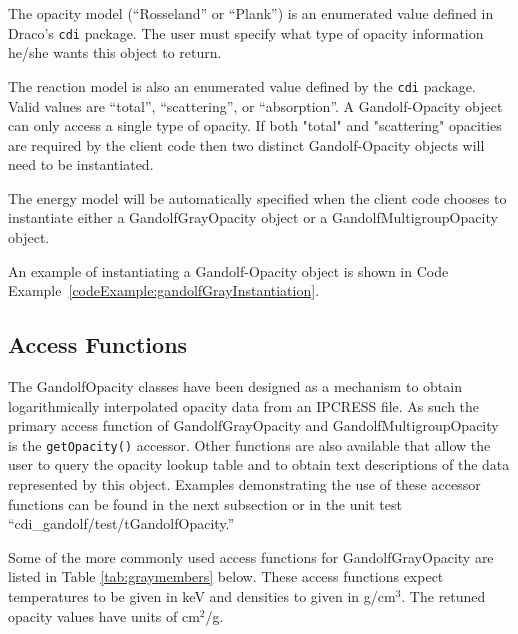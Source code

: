 \documentclass[11pt]{nmemo}
\newcommand{\draco}{{\normalfont\sffamily Draco}}
\begin{document}
The opacity model (``Rosseland'' or ``Plank'') is an enumerated value
defined in \draco's \texttt{cdi} package.  The user must specify what
type of opacity information he/she wants this object to return.

The reaction model is also an enumerated value defined by the
\texttt{cdi} package.  Valid values are ``total'', ``scattering'', or
``absorption''.  A Gandolf-Opacity object can only access a single
type of opacity.  If both "total" and "scattering" opacities are
required by the client code then two distinct Gandolf-Opacity objects
will need to be instantiated.

The energy model will be automatically specified when the client code
chooses to instantiate either a GandolfGrayOpacity object or a
GandolfMultigroupOpacity object.

An example of instantiating a Gandolf-Opacity object is shown in Code
Example~\ref{codeExample:gandolfGrayInstantiation}.


\subsection{Access Functions}

The GandolfOpacity classes have been designed as a mechanism to obtain
logarithmically interpolated opacity data from an IPCRESS file.  As
such the primary access function of GandolfGrayOpacity and
GandolfMultigroupOpacity is the \texttt{getOpacity()} accessor.  Other
functions are also available that allow the user to query the opacity
lookup table and to obtain text descriptions of the data represented
by this object. Examples demonstrating the use of these accessor
functions can be found in the next subsection or in the unit test
``cdi\_gandolf/test/tGandolfOpacity.''

Some of the more commonly used access functions for GandolfGrayOpacity
are listed in Table \ref{tab:graymembers} below.  These access
functions expect temperatures to be given in keV and densities to
given in g/cm$^3$.  The retuned opacity values have units of cm$^2$/g.
\end{document}
